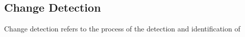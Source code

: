 \subsection{Change Detection}

Change detection refers to the process of  the detection and identification of 